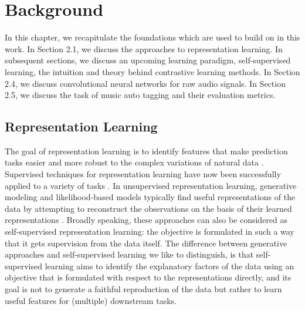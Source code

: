 \chapter{Background}\label{sec:background}
In this chapter, we recapitulate the foundations which are used to build on in this work. In Section 2.1, we discuss the approaches to representation learning. In subsequent sections, we discuss an upcoming learning paradigm, self-supervised learning, the intuition and theory behind contrastive learning methods. In Section 2.4, we discuss convolutional neural networks for raw audio signals. In Section 2.5, we discuss the task of music auto tagging and their evaluation metrics.

\section{Representation Learning}

The goal of representation learning is to identify features that make  prediction tasks easier and more robust to the complex variations of natural data \cite{bengio2013representation}. Supervised techniques for representation learning have now been successfully applied to a variety of tasks \cite{korzeniowski_fully_2016, chen_harmony_2019, korzeniowski_end--end_2017, bock_joint_2016, pons_end--end_2017, van_den_oord_deep_2013}. 
In unsupervised representation learning, generative modeling and likelihood-based models typically find useful representations of the data by attempting to reconstruct the observations on the basis of their learned representations \cite{goodfellow2014generative, unsupervised_gan}. Broadly speaking, these approaches can also be considered as self-supervised representation learning: the objective is formulated in such a way that it gets supervision from the data itself. The difference between generative approaches and self-supervised learning we like to distinguish, is that self-supervised learning aims to identify the explanatory factors of the data using an objective that is formulated with respect to the representations directly, and its goal is not to generate a faithful reproduction of the data but rather to learn useful features for (multiple) downstream tasks. \\

